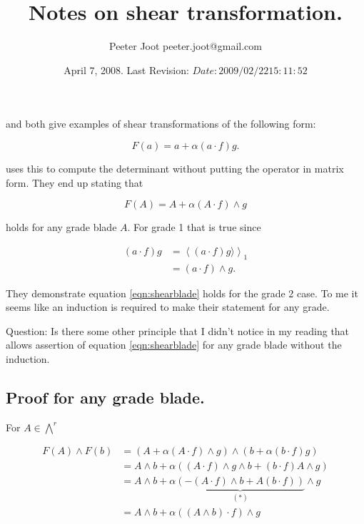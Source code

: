 \documentclass{article}
\title{ Notes on shear transformation. }
\author{Peeter Joot \quad peeter.joot@gmail.com}
\date{ April 7, 2008.  Last Revision: $Date: 2009/02/22 15:11:52 $ }
\newcommand{\gpgrade}[2] {{\left\langle{{#1}}\right\rangle}_{#2}}
\begin{document}
\maketitle{}

\section{}

\cite{dorst2007gac} and \cite{doran2003gap}
both give examples of shear transformations of the following
form:

\[
F(a) = a + \alpha(a \cdot f) g.
\]

\cite{doran2003gap}
uses this to compute the determinant without putting the operator in matrix form.  They end up stating that 

\begin{equation}\label{eqn:shearblade}
F(A) = A + \alpha (A \cdot f) \wedge g
\end{equation}

holds for any grade blade $A$.  For grade 1 that is true since

\begin{align*}
(a \cdot f) g 
&= \gpgrade{(a \cdot f) g \rangle}{1} \\
&= (a \cdot f) \wedge g.
\end{align*}

They demonstrate equation \ref{eqn:shearblade}
holds for the grade 2 case.  To me it seems
like an induction is required to make their statement for any grade.

Question: Is there some other principle that I didn't notice in my reading that allows assertion of 
equation \ref{eqn:shearblade}
for any grade blade without the induction.

\subsection{ Proof for any grade blade. }

For $A \in {\bigwedge}^r$

\begin{align*}
F(A) \wedge F(b)
&= \left(A + \alpha (A \cdot f) \wedge g \right) \wedge
   \left(b + \alpha(b \cdot f) g \right) \\
&= A \wedge b
 + \alpha 
\left(
(A \cdot f) \wedge g \wedge b
+ (b \cdot f) A \wedge g 
\right) \\
&= A \wedge b
 + \alpha 
\underbrace{
\left(
-(A \cdot f) \wedge b
+ A (b \cdot f) 
\right)
}_{(*)} 
\wedge g
\\
&= A \wedge b + \alpha ((A \wedge b) \cdot f) \wedge g
\end{align*}
\end{document}
